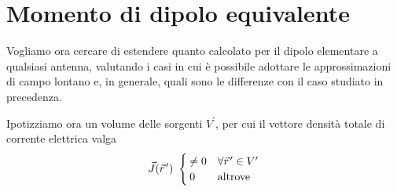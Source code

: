 



\section{Momento di dipolo equivalente}
Vogliamo ora cercare di estendere quanto calcolato per il dipolo elementare a qualsiasi antenna, valutando i casi in cui è possibile adottare le approssimazioni di campo lontano e, in generale, quali sono le differenze con il caso studiato in precedenza.

Ipotizziamo ora un volume delle sorgenti $V^\prime$, per cui il vettore densità totale di corrente elettrica valga
\begin{equation}
	\J(\rp) ~ \begin{cases}
		\neq 0 & \forall \rp \in V^\prime \\ 0 & \text{altrove}
	\end{cases}
\end{equation}

